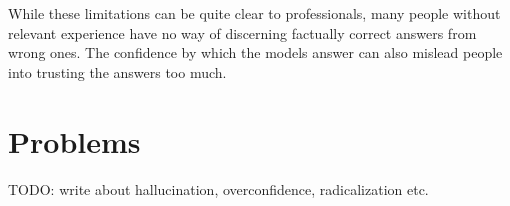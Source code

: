 \documentclass[twoside]{article}
\begin{document}
While these limitations can be quite clear to professionals, many people without relevant
experience have no way of discerning factually correct answers from wrong ones. The confidence
by which the models answer can also mislead people into trusting the answers too much.


\section{Problems}
TODO: write about hallucination, overconfidence, radicalization etc.



\printbibliography
\end{document}
